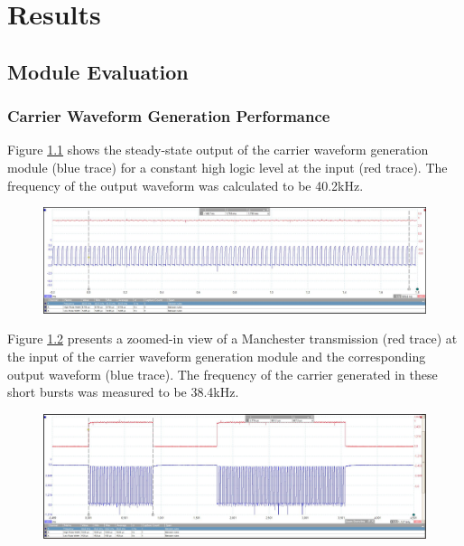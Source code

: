 \chapter{Results} %
\label{ch_results}



\section{Module Evaluation}

\subsection{Carrier Waveform Generation Performance}

Figure \ref{fig:carrier_steady_state} shows the steady-state output of the carrier waveform generation module (blue trace) for a constant high logic level at the input (red trace). The frequency of the output waveform was calculated to be 40.2kHz.

\begin{figure}[H]
	\centering
	\includegraphics[width=.9\linewidth]{figures/results/carrier_waveform_generation/steady_state.JPG}
	\label{fig:carrier_steady_state}
\end{figure}

Figure \ref{fig:carrier_manchester_zoomed_view} presents a zoomed-in view of a Manchester transmission (red trace) at the input of the carrier waveform generation module and the corresponding output waveform (blue trace). The frequency of the carrier generated in these short bursts was measured to be 38.4kHz.

\begin{figure}[H]
	\centering
	\includegraphics[width=.9\linewidth]{figures/results/carrier_waveform_generation/manchester_zoomed_view.JPG}
	\label{fig:carrier_manchester_zoomed_view}
\end{figure}

